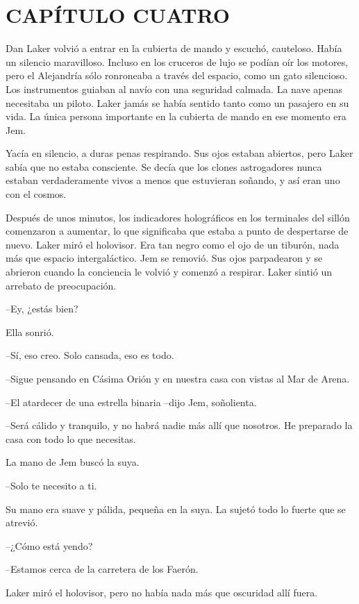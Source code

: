 \chapter*{CAPÍTULO CUATRO}

{Dan Laker volvió a entrar en la cubierta de mando y escuchó, cauteloso.
 Había un silencio maravilloso. Incluso en los cruceros de lujo se podían
 oír los motores, pero el Alejandría sólo ronroneaba a través del
 espacio, como un gato silencioso. Los instrumentos guiaban al navío con
 una seguridad calmada. La nave apenas necesitaba un piloto. Laker jamás
 se había sentido tanto como un pasajero en su vida. La única persona
importante en la cubierta de mando en ese momento era Jem.}

{Yacía en silencio, a duras penas respirando. Sus ojos estaban abiertos,
 pero Laker sabía que no estaba consciente. Se decía que los clones
 astrogadores nunca estaban verdaderamente vivos a menos que estuvieran
soñando, y así eran uno con el cosmos.}

{Después de unos minutos, los indicadores holográficos en los terminales
 del sillón comenzaron a aumentar, lo que significaba que estaba a punto
 de despertarse de nuevo. Laker miró el holovisor. Era tan negro como el
 ojo de un tiburón, nada más que espacio intergaláctico. Jem se removió.
 Sus ojos parpadearon y se abrieron cuando la conciencia le volvió y
comenzó a respirar. Laker sintió un arrebato de preocupación.}

{--Ey, ¿estás bien?}

{Ella sonrió.}

{--Sí, eso creo. Solo cansada, eso es todo.}

{--Sigue pensando en Cásima Orión y en nuestra casa con vistas al Mar de
Arena.}

{--El atardecer de una estrella binaria --dijo Jem, soñolienta.}

{--Será cálido y tranquilo, y no habrá nadie más allí que nosotros. He
preparado la casa con todo lo que necesitas.}

{La mano de Jem buscó la suya.}

{--Solo te necesito a ti.}

{Su mano era suave y pálida, pequeña en la suya. La sujetó todo lo fuerte
que se atrevió.}

{--¿Cómo está yendo?}

{--Estamos cerca de la carretera de los Faerón.}

{Laker miró el holovisor, pero no había nada más que oscuridad allí
fuera.}

